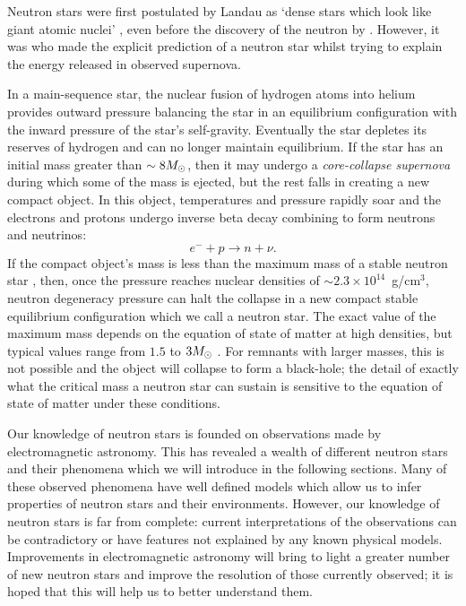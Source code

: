 \documentclass[../full_thesis/full_thesis.tex]{subfiles}
\begin{document}
 

Neutron stars were first postulated by Landau as `dense stars
which look like giant atomic nuclei' \citep{Yakovlev2013}, even before the
discovery of the neutron by \citet{Chadwick1932}. However, it was
\citet{Baade1934} who made the explicit prediction of a neutron star whilst
trying to explain the energy released in observed supernova.

In a main-sequence star, the nuclear fusion of
hydrogen atoms into helium provides outward pressure balancing the star in an
equilibrium configuration with the inward pressure of the star's self-gravity.
Eventually the star depletes its reserves of hydrogen and can no longer
maintain equilibrium. If the star has an initial mass greater than $\sim 8
M_{\odot}$, then it may undergo a \emph{core-collapse supernova} during which some
of the mass is ejected, but the rest falls in creating a new compact object.
In this object, temperatures and pressure rapidly soar and the
electrons and protons undergo inverse beta decay combining to form neutrons and
neutrinos:
\begin{equation}
    e^{-} + p \rightarrow n + \nu.
\end{equation}
If the compact object's mass is less than the maximum
mass of a stable neutron star \citep{oppenheimer1939massive},
then, once the pressure
reaches nuclear densities of $\sim 2.3 \times10^{14}$~g/cm$^{3}$, neutron
degeneracy pressure can halt the collapse in a new compact stable equilibrium
configuration which we call a neutron star. The exact value of the maximum
mass
depends on the equation of state of matter at high densities, but typical values
range from $1.5$ to $3 M_{\odot}$ \citep{bombaci1996}.
For remnants with larger masses,
this is not possible and the object will collapse to form a black-hole; the
detail of exactly what the critical mass a neutron star can sustain is
sensitive to the equation of state of matter under these conditions.

Our knowledge of neutron stars is founded on observations made by
electromagnetic astronomy. This has revealed a wealth of different neutron
stars and their phenomena which we will introduce in the following sections.
Many of these observed phenomena have well defined models which allow us to
infer properties of neutron stars and their environments.  However, our
knowledge of neutron stars is far from complete: current interpretations of the
observations can be contradictory or have features not explained by any known
physical models. Improvements in electromagnetic astronomy will bring to light
a greater number of new neutron stars and improve the resolution of those
currently observed; it is hoped that this will help us to better understand
them.
\end{document}
